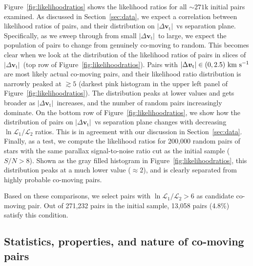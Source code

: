 \documentclass[manuscript, letterpaper]{aastex6}
\newcommand{\sectionname}{Section}
\newcommand{\bs}[1]{\boldsymbol{#1}}
\renewcommand{\vec}[1]{\bs{#1}}
\newcommand{\kms}{\ensuremath{\rm km~s^{-1}}}
\newcommand{\absdvtan}{\ensuremath{|\Delta\vec v_\mathrm{t}|}}
\begin{document}
Figure~\ref{fig:likelihoodratios} shows the likelihood ratios for all
$\sim 271$k initial pairs examined.
As discussed in \sectionname~\ref{sec:data}, we expect a correlation between likelihood
ratios of pairs, and their distribution on \absdvtan\ vs separation plane.
Specifically, as we sweep through from small \absdvtan\ to large, we expect
the population of pairs to change from genuinely co-moving to random.
This becomes clear when we look at the distribution of the likelihood ratios of pairs
in slices of \absdvtan\ (top row of Figure~\ref{fig:likelihoodratios}).
Pairs with $\absdvtan \in (0,2.5)~\kms$ are most likely actual co-moving pairs, and
their likelihood ratio distribution is narrowly peaked at $\gtrsim 5$
(darkest pink histogram in the upper left panel of Figure~\ref{fig:likelihoodratios}).
The distribution peaks at lower values and gets broader as \absdvtan\ increases,
and the number of random pairs increasingly dominate.
On the bottom row of Figure~\ref{fig:likelihoodratios}, we show
how the distribution of pairs on \absdvtan\ vs separation plane changes
with decreasing $\ln \mathcal{L}_1 /\mathcal{L}_2$ ratios.
This is in agreement with our discussion in \sectionname~\ref{sec:data}.
Finally, as a test,
we compute the likelihood ratios for 200,000 random pairs of stars with the same
parallax signal-to-noise ratio cut as the initial sample ($S/N > 8$).
Shown as the gray filled histogram in Figure~\ref{fig:likelihoodratios},
this distribution peaks at a much lower value ($\approx 2$),
and is clearly separated from highly probable co-moving pairs.

Based on these comparisons, we select pairs with
$\ln \mathcal{L}_1 /\mathcal{L}_2 > 6$ as candidate co-moving pair.
Out of 271,232 pairs in the initial sample, 13,058 pairs (4.8\%)
satisfy this condition.

\subsection{Statistics, properties, and nature of co-moving pairs}
\end{document}
